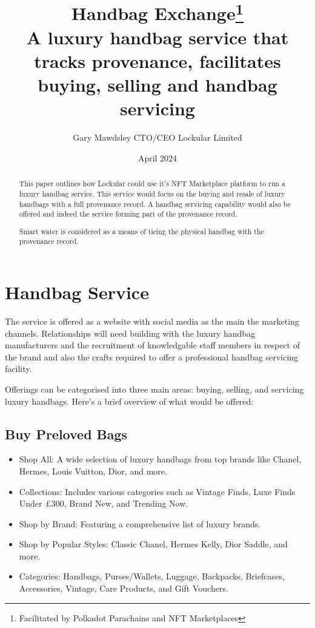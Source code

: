 \documentclass{tufte-handout}
\title{Handbag Exchange\thanks{Facilitated by Polkadot Parachains and NFT Marketplaces} \\
\large A luxury handbag service that tracks provenance, facilitates buying, selling and handbag servicing}
\author[Gary Mawdsley]{Gary Mawdsley CTO/CEO Lockular Limited}
\date{April 2024}  %
\begin{document}
\maketitle%

\begin{abstract}
\noindent This paper outlines how Lockular could use it's NFT Marketplace platform to run a luxury handbag service.
This service would focus on the buying and resale of luxury handbags with a full provenance record. A handbag servicing capability
would also be offered and indeed the service forming part of the provenance record.

Smart water is considered as a means of tieing the physical handbag with the provenance record.

\end{abstract}

{}

\section{Handbag Service}\label{sec:page-layout}
The service is offered as a website with social media as the main the marketing channels. Relationships will need building with the
luxury handbag manufacturers and the recruitment of knowledgable staff members in respect of the brand and also the crafts required to offer
a professional handbag servicing facility.

Offerings can be categorised into three main areas: buying, selling, and servicing luxury handbags. Here's a brief overview of what
would be offered:

\subsection{Buy Preloved Bags}\label{sec:page-layout}
\begin{itemize}
    \item Shop All: A wide selection of luxury handbags from top brands like Chanel, Hermes, Louis Vuitton, Dior, and more.
    \item Collections: Includes various categories such as Vintage Finds, Luxe Finds Under £300, Brand New, and Trending Now.
    \item Shop by Brand: Featuring a comprehensive list of luxury brands.
    \item Shop by Popular Styles: Classic Chanel, Hermes Kelly, Dior Saddle, and more.
    \item Categories: Handbags, Purses/Wallets, Luggage, Backpacks, Briefcases, Accessories, Vintage, Care Products, and Gift Vouchers.
\end{itemize}
\end{document}
